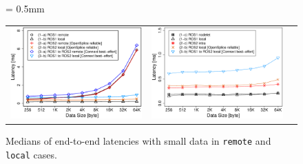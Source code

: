 \documentclass{sig-alternate-05-2015}
\begin{document}
\begin{figure}[t]
  \tabcolsep = 0.5mm              %
  \begin{tabular}{ccc}
    \begin{minipage}[t]{0.32\textwidth}
      \includegraphics[width=1.0\linewidth]{../figure/comparison_remote_local_small-data_Plot.eps}
      \vspace{-7mm}
      \caption{Medians of end-to-end latencies with small data in \texttt{remote} and \texttt{local} cases.}
      \label{fig:remote_local_small_plot}
    \end{minipage}   
    &
    \setcounter{figure}{8}
    \begin{minipage}[t]{0.32\textwidth}
      \includegraphics[width=1.0\linewidth]{../figure/comparison_intra_nodelet_local_small-data_Plot.eps}
      \vspace{-7mm}

\end{minipage}
\end{tabular}
\end{figure}
\end{document}
